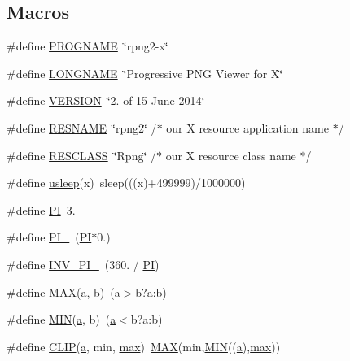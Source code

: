 \subsection*{Macros}
\begin{DoxyCompactItemize}
\item 
\#define \mbox{\hyperlink{rpng2-x_8c_a8c9afb758de9a0355c93fc926b8ce6b1}{P\+R\+O\+G\+N\+A\+ME}}~\char`\"{}rpng2-\/x\char`\"{}
\item 
\#define \mbox{\hyperlink{rpng2-x_8c_ae8176192ea4d52bb0acbcfeaaffb3bd8}{L\+O\+N\+G\+N\+A\+ME}}~\char`\"{}Progressive P\+NG Viewer for X\char`\"{}
\item 
\#define \mbox{\hyperlink{rpng2-x_8c_a1c6d5de492ac61ad29aec7aa9a436bbf}{V\+E\+R\+S\+I\+ON}}~\char`\"{}2. of 15 June 2014\char`\"{}
\item 
\#define \mbox{\hyperlink{rpng2-x_8c_a26d3cf6f35fd25b054ff41b03368b31b}{R\+E\+S\+N\+A\+ME}}~\char`\"{}rpng2\char`\"{}       /$\ast$ our X resource application name $\ast$/
\item 
\#define \mbox{\hyperlink{rpng2-x_8c_a3b0a2ac91fca697e3acedd9903efd4fd}{R\+E\+S\+C\+L\+A\+SS}}~\char`\"{}Rpng\char`\"{}       /$\ast$ our X resource class name $\ast$/
\item 
\#define \mbox{\hyperlink{rpng2-x_8c_a44ed0f898da2dd3ada04f222e0dce283}{usleep}}(x)~sleep(((x)+499999)/1000000)
\item 
\#define \mbox{\hyperlink{rpng2-x_8c_a598a3330b3c21701223ee0ca14316eca}{PI}}~3.
\item 
\#define \mbox{\hyperlink{rpng2-x_8c_a7c7671235d3f0d09bc5c011920fe0d5b}{P\+I\+\_}}~(\mbox{\hyperlink{rpng2-x_8c_a598a3330b3c21701223ee0ca14316eca}{PI}}$\ast$0.)
\item 
\#define \mbox{\hyperlink{rpng2-x_8c_a99c039c85f9ce3e4a4dc4f95fce32972}{I\+N\+V\+\_\+\+P\+I\+\_}}~(360. / \mbox{\hyperlink{rpng2-x_8c_a598a3330b3c21701223ee0ca14316eca}{PI}})
\item 
\#define \mbox{\hyperlink{rpng2-x_8c_afa99ec4acc4ecb2dc3c2d05da15d0e3f}{M\+AX}}(\mbox{\hyperlink{isa-lr35902_8c_a7015284d2957ab7cdf82d2535a2fa547}{a}},  b)~(\mbox{\hyperlink{isa-lr35902_8c_a7015284d2957ab7cdf82d2535a2fa547}{a}}$>$b?a\+:b)
\item 
\#define \mbox{\hyperlink{rpng2-x_8c_a3acffbd305ee72dcd4593c0d8af64a4f}{M\+IN}}(\mbox{\hyperlink{isa-lr35902_8c_a7015284d2957ab7cdf82d2535a2fa547}{a}},  b)~(\mbox{\hyperlink{isa-lr35902_8c_a7015284d2957ab7cdf82d2535a2fa547}{a}}$<$b?a\+:b)
\item 
\#define \mbox{\hyperlink{rpng2-x_8c_a747f7929e94899e6b0714649864b8711}{C\+L\+IP}}(\mbox{\hyperlink{isa-lr35902_8c_a7015284d2957ab7cdf82d2535a2fa547}{a}},  min,  \mbox{\hyperlink{enough_8c_a3f41d878a34048480562aba063c70c92}{max}})~\mbox{\hyperlink{sqlite3_8c_ad935f1ff1a50822e317bdb321ce991ad}{M\+AX}}(min,\mbox{\hyperlink{sqlite3_8c_adcd021ac91d43a62b2cdecf9a5b971a7}{M\+IN}}((\mbox{\hyperlink{isa-lr35902_8c_a7015284d2957ab7cdf82d2535a2fa547}{a}}),\mbox{\hyperlink{enough_8c_a3f41d878a34048480562aba063c70c92}{max}}))

\end{DoxyCompactItemize}

